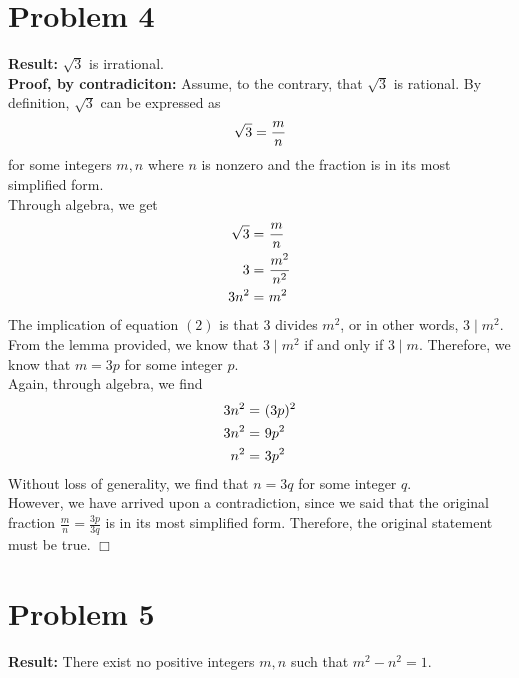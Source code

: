 \documentclass[11pt]{article}
\begin{document}
\newpage


\section*{Problem 4}

    \textbf{Result:} $\sqrt{3}$ is irrational. \\

    \textbf{Proof, by contradiciton:} Assume, to the contrary, that $\sqrt{3}$ is rational. By definition, $\sqrt{3}$ can be expressed as
    \begin{align}
        \sqrt{3} = \frac{m}{n} \notag
    \end{align}
    for some integers $m, n$ where $n$ is nonzero and the fraction is in its most simplified form. \\
    Through algebra, we get
    \begin{align}
        \sqrt{3} =& \ \frac{m}{n} \notag \\
        3 =& \ \frac{m^2}{n^2} \notag \\
        3n^2 =& \ m^2 
    \end{align}
    The implication of equation $(2)$ is that 3 divides $m^2$, or in other words, $3 \mid m^2$. From the lemma provided, we know that $3 \mid m^2$ if and only if $3 \mid m$. Therefore, we know that $m = 3p$ for some integer $p$. \\
    Again, through algebra, we find
    \begin{align}
        3n^2 =& \ (3p)^2 \notag \\
        3n^2 =& \  9p^2 \notag \\
        n^2 =& \ 3p^2 \notag
    \end{align}
    Without loss of generality, we find that $n = 3q$ for some integer $q$.\\
    However, we have arrived upon a contradiction, since we said that the original fraction $\frac{m}{n} = \frac{3p}{3q}$ is in its most simplified form. Therefore, the original statement must be true. \hfill $\Box$

\newpage



\section*{Problem 5}

    \textbf{Result:} There exist no positive integers $m, n$ such that $m^2 - n^2 = 1$.\\
    
\end{document}
